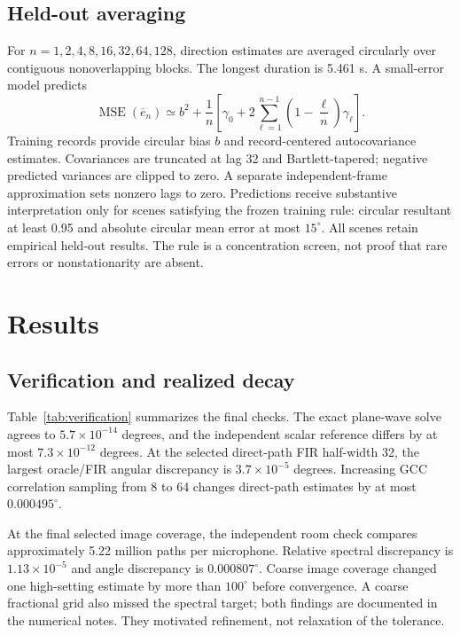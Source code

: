 \documentclass[10pt,a4paper,twocolumn]{article}
\begin{document}
\subsection{Held-out averaging}
For $n=1,2,4,8,16,32,64,128$, direction estimates are averaged circularly over contiguous nonoverlapping blocks. The longest duration is 5.461 s. A small-error model predicts
\begin{equation}
 \operatorname{MSE}(\overline e_n)\simeq b^2+
 \frac{1}{n}\left[\gamma_0+2\sum_{\ell=1}^{n-1}
 \left(1-\frac{\ell}{n}\right)\gamma_\ell\right].
 \label{eq:variance}
\end{equation}
Training records provide circular bias $b$ and record-centered autocovariance estimates. Covariances are truncated at lag 32 and Bartlett-tapered; negative predicted variances are clipped to zero. A separate independent-frame approximation sets nonzero lags to zero. Predictions receive substantive interpretation only for scenes satisfying the frozen training rule: circular resultant at least 0.95 and absolute circular mean error at most $15^\circ$. All scenes retain empirical held-out results. The rule is a concentration screen, not proof that rare errors or nonstationarity are absent.

\section{Results}
\subsection{Verification and realized decay}
Table~\ref{tab:verification} summarizes the final checks. The exact plane-wave solve agrees to $5.7\times10^{-14}$ degrees, and the independent scalar reference differs by at most $7.3\times10^{-12}$ degrees. At the selected direct-path FIR half-width 32, the largest oracle/FIR angular discrepancy is $3.7\times10^{-5}$ degrees. Increasing GCC correlation sampling from 8 to 64 changes direct-path estimates by at most $0.000495^\circ$.

At the final selected image coverage, the independent room check compares approximately 5.22 million paths per microphone. Relative spectral discrepancy is $1.13\times10^{-5}$ and angle discrepancy is $0.000807^\circ$. Coarse image coverage changed one high-setting estimate by more than $100^\circ$ before convergence. A coarse fractional grid also missed the spectral target; both findings are documented in the numerical notes. They motivated refinement, not relaxation of the tolerance.
\end{document}
